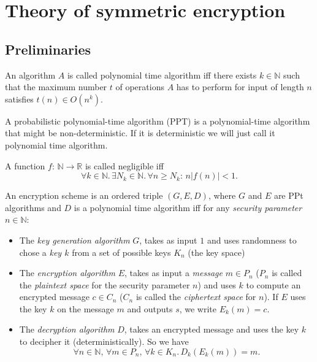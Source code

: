 \section{Theory of symmetric encryption}
\subsection{Preliminaries}
\begin{definition}
 An algorithm $A$ is called polynomial time algorithm iff there exists $k\in \mathbb{N}$ such that the maximum number $t$ of operations $A$ has to perform for input of length $n$ satisfies $t(n)\in O(n^k)$.
\end{definition}
\begin{definition}
 A probabilistic polynomial-time algorithm (PPT) is a polynomial-time algorithm that might be non-deterministic. If it is deterministic we will just call it polynomial time algorithm.
\end{definition}
\begin{definition}
 A function $f:\,\mathbb{N}\to\mathbb{R}$ is called negligible iff $$\forall k\in\mathbb{N}.\,\exists N_k\in\mathbb{N}.\,\forall n\geq N_k:\,n\left|f(n)\right|<1.$$
\end{definition}
\begin{definition}
 An encryption scheme is an ordered triple $(G, E, D)$, where $G$ and $E$ are PPt algorithms and $D$ is a polynomial time algorithm iff for any \emph{security parameter} $n\in\mathbb{N}$:
 \begin{itemize}
  \item The \emph{key generation algorithm} $G$, takes as input $1$ and uses randomness to chose a \emph{key $k$} from a set of possible keys $K_n$ (the key space)
  \item The \emph{encryption algorithm} $E$, takes as input a \emph{message} $m\in P_n$ ($P_n$ is called the \emph{plaintext space} for the security parameter $n$) and uses $k$ to compute an encrypted message $c\in C_n$ ($C_n$ is called the \emph{ciphertext space} for $n$). If $E$ uses the key $k$ on the message $m$ and outputs $s$, we write $E_k(m)=c$.
  \item The \emph{decryption algorithm} $D$, takes an encrypted message and uses the key $k$ to decipher it (deterministically). So we have $$\forall n\in\mathbb{N},\,\forall m\in P_n,\,\forall k \in K_n.\,D_k(E_k(m))=m.$$
 \end{itemize}
\end{definition}
